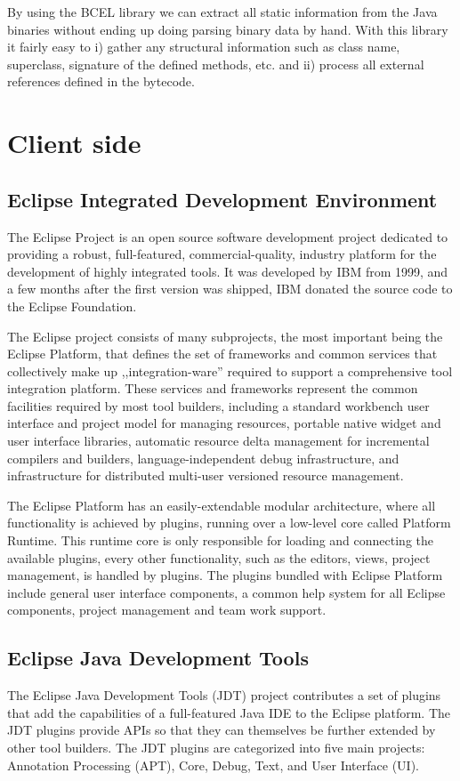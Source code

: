 By using the BCEL library we can extract all static information from the Java binaries without
ending up doing parsing binary data by hand. With this library it fairly easy to
i) gather any structural information such as class name, superclass, signature
of the defined methods, etc. and ii) process all external references defined in the 
bytecode.


\section{Client side}

\subsection{Eclipse Integrated Development Environment}
The Eclipse Project \cite{Eclipseproject} is an open source software development
project dedicated to providing a robust, full-featured, commercial-quality,
industry platform for the development of highly integrated tools. It was
developed by IBM from 1999, and a few months after the first version was
shipped, IBM donated the source code to the Eclipse Foundation.

The Eclipse project consists of many subprojects, the most important being the
Eclipse Platform, that defines the set of frameworks and common services that
collectively make up ,,integ\-ration-ware'' required to support a comprehensive
tool integration platform. These services and frameworks represent the common
facilities required by most tool builders, including a standard workbench user
interface and project model for managing resources, portable native widget and
user interface libraries, automatic resource delta management for incremental
compilers and builders, language-independent debug infrastructure, and
infrastructure for distributed multi-user versioned resource management.

The Eclipse Platform has an easily-extendable modular architecture, where all
functionality is achieved by plugins, running over a low-level core called
Platform Runtime. This runtime core is only responsible for loading and
connecting the available plugins, every other functionality, such as the
editors, views, project management, is handled by plugins. The plugins bundled
with Eclipse Platform include general user interface components, a common help
system for all Eclipse components, project management and team work support.

\subsection{Eclipse Java Development Tools}
The Eclipse Java Development Tools (JDT) project \cite{JDT} contributes a set of
plugins that add the capabilities of a full-featured Java IDE to the Eclipse
platform. The JDT plugins provide APIs so that they can themselves be further
extended by other tool builders. The JDT plugins are categorized into five main
projects: Annotation Processing (APT), Core, Debug, Text, and User Interface
(UI).

